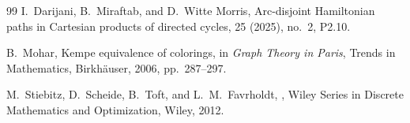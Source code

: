 \documentclass[11pt]{article}
\begin{document}
\begin{thebibliography}{99}
I.~Darijani, B.~Miraftab, and D.~Witte Morris,
\newblock Arc-disjoint Hamiltonian paths in Cartesian products of directed cycles,
 25 (2025), no.~2, P2.10.

B.~Mohar,
\newblock Kempe equivalence of colorings,
\newblock in {\em Graph Theory in Paris}, Trends in Mathematics, Birkh\"auser, 2006, pp.~287--297.

M.~Stiebitz, D.~Scheide, B.~Toft, and L.~M.~Favrholdt,
,
\newblock Wiley Series in Discrete Mathematics and Optimization, Wiley, 2012.

\end{thebibliography}
\end{document}
